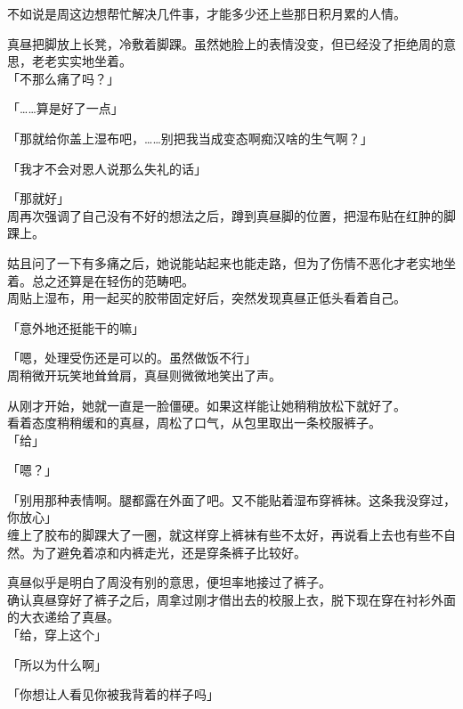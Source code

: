 不如说是周这边想帮忙解决几件事，才能多少还上些那日积月累的人情。

真昼把脚放上长凳，冷敷着脚踝。虽然她脸上的表情没变，但已经没了拒绝周的意思，老老实实地坐着。\\

「不那么痛了吗？」

「……算是好了一点」

「那就给你盖上湿布吧，……别把我当成变态啊痴汉啥的生气啊？」

「我才不会对恩人说那么失礼的话」

「那就好」\\

周再次强调了自己没有不好的想法之后，蹲到真昼脚的位置，把湿布贴在红肿的脚踝上。

姑且问了一下有多痛之后，她说能站起来也能走路，但为了伤情不恶化才老实地坐着。总之还算是在轻伤的范畴吧。\\

周贴上湿布，用一起买的胶带固定好后，突然发现真昼正低头看着自己。

「意外地还挺能干的嘛」

「嗯，处理受伤还是可以的。虽然做饭不行」\\

周稍微开玩笑地耸耸肩，真昼则微微地笑出了声。

从刚才开始，她就一直是一脸僵硬。如果这样能让她稍稍放松下就好了。\\

看着态度稍稍缓和的真昼，周松了口气，从包里取出一条校服裤子。\\

「给」

「嗯？」

「别用那种表情啊。腿都露在外面了吧。又不能贴着湿布穿裤袜。这条我没穿过，你放心」\\

缠上了胶布的脚踝大了一圈，就这样穿上裤袜有些不太好，再说看上去也有些不自然。为了避免着凉和内裤走光，还是穿条裤子比较好。

真昼似乎是明白了周没有别的意思，便坦率地接过了裤子。\\

确认真昼穿好了裤子之后，周拿过刚才借出去的校服上衣，脱下现在穿在衬衫外面的大衣递给了真昼。\\

「给，穿上这个」

「所以为什么啊」

「你想让人看见你被我背着的样子吗」\\

